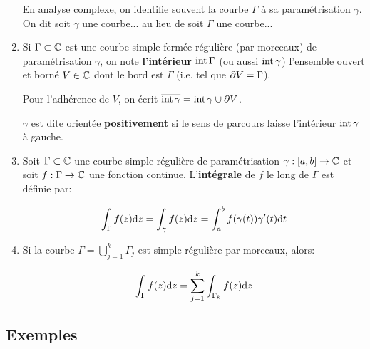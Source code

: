 \begin{definition}
\begin{enumerate}[label=\arabic{enumi})]
    \begin{note}
        En analyse complexe, on identifie souvent la courbe $\Gamma$ à sa paramétrisation $\gamma$.
        On dit \og soit $\gamma$ une courbe... \fg{} au lieu de \og soit $\Gamma$ une courbe...\fg{}
    \end{note}

    \item
    Si $\Gamma \subset \mathbb{C}$ est une courbe simple fermée régulière (par morceaux) de paramétrisation $\gamma$, on note \textbf{l'intérieur} $\textrm{int}\, \Gamma$ (ou aussi $\textrm{int}\, \gamma$) l'ensemble ouvert et borné $V \in \mathbb{C}$ dont le bord est $\Gamma$ (i.e. tel que $\partial V = \Gamma$).
    
    Pour l'adhérence de $V$, on écrit $\overline{\textrm{int}\, \gamma} = \textrm{int}\, \gamma \cup \partial V$.
    
    \begin{note}
        $\gamma$ est dite orientée \textbf{positivement} si le sens de parcours laisse l'intérieur $\textrm{int}\, \gamma$ à gauche.
    \end{note}
    
    \item
    Soit $\Gamma \subset \mathbb{C}$ une courbe simple régulière de paramétrisation $\gamma: [a,b] \rightarrow \mathbb{C}$ et soit $f: \Gamma \rightarrow \mathbb{C}$ une fonction continue.
    L'\textbf{intégrale} de $f$ le long de $\Gamma$ est définie par:
    
    \[\int_\Gamma f(z) \mathrm{d}z = \int_\gamma f(z) \mathrm{d}z = \int_a^b f(\gamma(t)) \gamma'(t) \mathrm{d}t\]
    
    \item
    Si la courbe $\Gamma = \bigcup\limits_{j = 1}^k \Gamma_j$ est simple régulière par morceaux, alors:
    
    \[\int_\Gamma f(z) \mathrm{d}z = \sum_{j=1}^k \int_{\Gamma_k} f(z) \mathrm{d}z\]
\end{enumerate}
\end{definition}

\subsection{Exemples}

